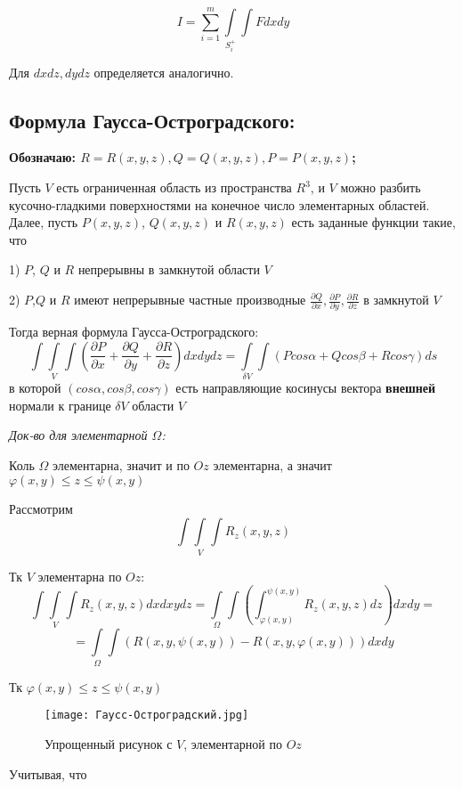 \documentclass{article}
\begin{document}
$$
I
=
\sum_{i = 1}^{m} \int\limits_{S_i^+}\int F dxdy 
$$

Для $dxdz , dydz$ определяется аналогично. 


\newpage
\subsection*{Формула Гаусса-Остроградского:}
\textbf{Обозначаю: $R = R(x, y ,z) , Q = Q(x,y,z) , P = P(x,y,z)$;}

		Пусть $V$ есть ограниченная область из пространства $R^3$, и $V$ можно разбить кусочно-гладкими поверхностями на конечное число элементарных областей. Далее, пусть $P(x, y ,z)$, $Q(x, y ,z)$ и $R(x,y,z)$ есть заданные функции
такие, что 

1)  $P$, $Q$ и $R$ непрерывны в замкнутой области $V$


2) $P$,$Q$ и $R$ имеют непрерывные частные производные $\frac{\partial Q}{\partial x},\frac{\partial P}{\partial y},
\frac{\partial R}{\partial z} $ в замкнутой $V$

Тогда верная формула Гаусса-Остроградского:
$$
\int\int\limits_{V}\int (\frac{\partial P}{\partial x} + \frac{\partial Q}{\partial y} + \frac{\partial R}{\partial z})dxdydz
=
\int\limits_{\delta V}\int (Pcos\alpha + Qcos\beta + Rcos\gamma)ds
$$
в которой $(cos\alpha, cos\beta, cos\gamma)$ есть направляющие косинусы вектора \textbf{внешней} нормали к границе $\delta V$ области $V$

\textit{Док-во для элементарной $\Omega$:}

	Коль $\Omega$ элементарна, значит и по $Oz$ элементарна, а значит
	$\varphi(x,y) \leq z \leq \psi(x,y)$

	Рассмотрим 
	$$\int\int\limits_{V}\int R_z(x,y,z)$$


Тк $V$ элементарна по $Oz$:
$$
\int\int\limits_{V}\int R_z(x,y,z) dxdxydz
=
\int\limits_{\Omega}\int(\int_{\varphi(x,y)}^{\psi(x,y)} R_z(x,y,z)dz) dxdy
=
$$
$$
=
\int\limits_{\Omega}\int (R(x,y,\psi(x,y)) - R(x,y,\varphi(x,y)))dxdy
$$

Тк $\varphi(x,y) \leq z \leq \psi(x,y)$

	
\begin{figure}
\begin{center}
\texttt{[image: Гаусс-Остроградский.jpg]}
\caption{Упрощенный рисунок с $V$, элементарной по $Oz$}
\end{center}
\end{figure}

Учитывая, что 
\end{document}
